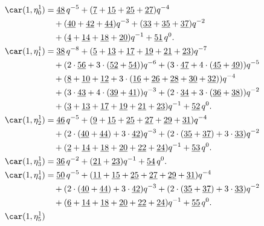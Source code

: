 \begin{align*}
	\car(1,\eta^{1}_{0})
	&=\underline{48}\,q^{-5}+(\underline{7}+\underline{15}+\underline{25}+\underline{27})q^{-4}\\
	&\quad+(\underline{40}+\underline{42}+\underline{44})q^{-3}+(\underline{33}+\underline{35}+\underline{37})q^{-2}\\
	&\quad+(\underline{4}+\underline{14}+\underline{18}+\underline{20})q^{-1}+\underline{51}\,q^0.\\
	\car(1,\eta^{1}_{1})
	&=\underline{38}\,q^{-8}+(\underline{5}+\underline{13}+\underline{17}+\underline{19}+\underline{21}+\underline{23})q^{-7}\\
	&\quad+(2\cdot\underline{56}+3\cdot(\underline{52}+\underline{54}))q^{-6}+(3\cdot\underline{47}+4\cdot(\underline{45}+\underline{49}))q^{-5}\\
	&\quad+(\underline{8}+\underline{10}+\underline{12}+3\cdot(\underline{16}+\underline{26}+\underline{28}+\underline{30}+\underline{32}))q^{-4}\\
	&\quad+(3\cdot\underline{43}+4\cdot(\underline{39}+\underline{41}))q^{-3}+(2\cdot\underline{34}+3\cdot(\underline{36}+\underline{38}))q^{-2}\\
	&\quad+(\underline{3}+\underline{13}+\underline{17}+\underline{19}+\underline{21}+\underline{23})q^{-1}+\underline{52}\,q^0.\\
	\car(1,\eta^{1}_{2})
	&=\underline{46}\,q^{-5}+(\underline{9}+\underline{15}+\underline{25}+\underline{27}+\underline{29}+\underline{31})q^{-4}\\
	&\quad+(2\cdot(\underline{40}+\underline{44})+3\cdot\underline{42})q^{-3}+(2\cdot(\underline{35}+\underline{37})+3\cdot\underline{33})q^{-2}\\
	&\quad+(\underline{2}+\underline{14}+\underline{18}+\underline{20}+\underline{22}+\underline{24})q^{-1}+\underline{53}\,q^0.\\
	\car(1,\eta^{1}_{3})
	&=\underline{36}\,q^{-2}+(\underline{21}+\underline{23})q^{-1}+\underline{54}\,q^0.\\
	\car(1,\eta^{1}_{4})
	&=\underline{50}\,q^{-5}+(\underline{11}+\underline{15}+\underline{25}+\underline{27}+\underline{29}+\underline{31})q^{-4}\\
	&\quad+(2\cdot(\underline{40}+\underline{44})+3\cdot\underline{42})q^{-3}+(2\cdot(\underline{35}+\underline{37})+3\cdot\underline{33})q^{-2}\\
	&\quad+(\underline{6}+\underline{14}+\underline{18}+\underline{20}+\underline{22}+\underline{24})q^{-1}+\underline{55}\,q^0.\\
	\car(1,\eta^{1}_{5})

\end{align*}
